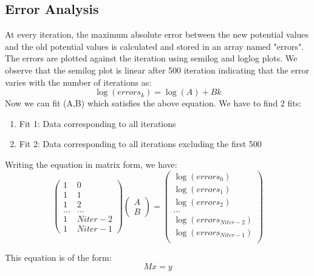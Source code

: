 \documentclass[12pt, a4paper]{article}
\begin{document}
\subsection{Error Analysis}
At every iteration, the maximum absolute error between the new potential values and the old potential values is calculated and stored in an array named "errors".
The errors are plotted against the iteration using semilog and loglog plots. We observe that the semilog plot is linear after 500 iteration indicating that the error varies with the number of iterations as:
\begin{equation*}
    \log (errors_{k}) = \log (A) + Bk
\end{equation*}
Now we can fit (A,B) which satisfies the above equation. We have to find 2 fits:
\vspace{-0.3cm}
\begin{enumerate}
    \item Fit 1: Data corresponding to all iterations
    \item Fit 2: Data corresponding to all iterations excluding the first 500
\end{enumerate}
Writing the equation in matrix form, we have:
\begin{equation*}
    \begin{pmatrix}
        1 & 0 \\
        1 & 1 \\
        1 & 2 \\
        \ldots & \ldots \\
        1 & Niter - 2 \\
        1 & Niter - 1
    \end{pmatrix}
    \begin{pmatrix}
        A\\
        B
    \end{pmatrix}
    = \begin{pmatrix}
        \log (errors_{0}) \\
        \log (errors_{1}) \\
        \log (errors_{2}) \\
        \ldots \\
        \log (errors_{Niter - 2 }) \\
        \log (errors_{Niter - 1}) \\
    \end{pmatrix}
\end{equation*}

This equation is of the form:
\begin{equation*}
    Mx = y
\end{equation*}
\end{document}
